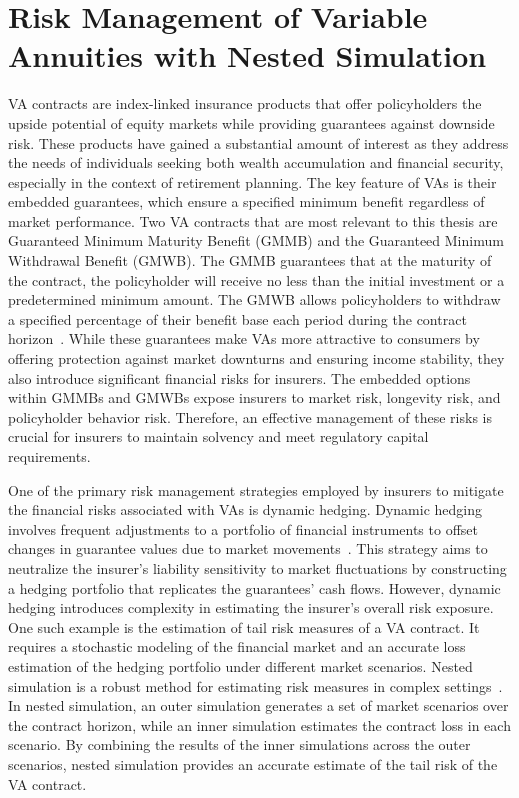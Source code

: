 \section{Risk Management of Variable Annuities with Nested Simulation}

VA contracts are index-linked insurance products that offer policyholders the upside potential of equity markets while providing guarantees against downside risk.
These products have gained a substantial amount of interest as they address the needs of individuals seeking both wealth accumulation and financial security, especially in the context of retirement planning.
The key feature of VAs is their embedded guarantees, which ensure a specified minimum benefit regardless of market performance.
Two VA contracts that are most relevant to this thesis are Guaranteed Minimum Maturity Benefit (GMMB) and the Guaranteed Minimum Withdrawal Benefit (GMWB).
The GMMB guarantees that at the maturity of the contract, the policyholder will receive no less than the initial investment or a predetermined minimum amount.
The GMWB allows policyholders to withdraw a specified percentage of their benefit base each period during the contract horizon~\citep{hardy2003investment}.
While these guarantees make VAs more attractive to consumers by offering protection against market downturns and ensuring income stability, they also introduce significant financial risks for insurers.
The embedded options within GMMBs and GMWBs expose insurers to market risk, longevity risk, and policyholder behavior risk.
Therefore, an effective management of these risks is crucial for insurers to maintain solvency and meet regulatory capital requirements.

One of the primary risk management strategies employed by insurers to mitigate the financial risks associated with VAs is dynamic hedging.
Dynamic hedging involves frequent adjustments to a portfolio of financial instruments to offset changes in guarantee values due to market movements~\citep{hull2016options}.
This strategy aims to neutralize the insurer's liability sensitivity to market fluctuations by constructing a hedging portfolio that replicates the guarantees' cash flows.
However, dynamic hedging introduces complexity in estimating the insurer's overall risk exposure.
One such example is the estimation of tail risk measures of a VA contract.
It requires a stochastic modeling of the financial market and an accurate loss estimation of the hedging portfolio under different market scenarios.
Nested simulation is a robust method for estimating risk measures in complex settings~\citep{gordy2010nested}.
In nested simulation, an outer simulation generates a set of market scenarios over the contract horizon, while an inner simulation estimates the contract loss in each scenario.
By combining the results of the inner simulations across the outer scenarios, nested simulation provides an accurate estimate of the tail risk of the VA contract.

